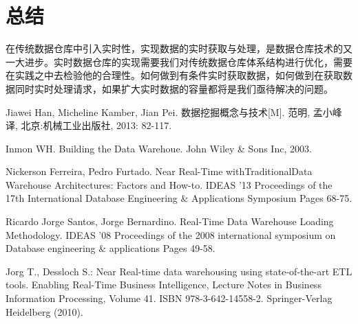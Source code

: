 \documentclass[onecolumn,a4paper,10pt]{article}
\begin{document}
\section{总结}
在传统数据仓库中引入实时性，实现数据的实时获取与处理，是数据仓库技术的又一大进步。实时数据仓库的实现需要我们对传统数据仓库体系结构进行优化，需要在实践之中去检验他的合理性。如何做到有条件实时获取数据，如何做到在获取数据同时实时处理请求，如果扩大实时数据的容量都将是我们亟待解决的问题。

\small
\begin{thebibliography}{99}
\setlength{\itemsep}{0pt}
\setlength{\parskip}{5pt}  %

 Jiawei Han, Micheline Kamber, Jian Pei. 数据挖掘概念与技术[M]. 范明, 孟小峰译, 北京:机械工业出版社, 2013: 82-117.

 Inmon WH. Building the Data Warehoue. John Wiley \& Sons Inc, 2003.

 Nickerson Ferreira, Pedro Furtado. Near Real-Time withTraditionalData Warehouse Architectures: Factors and How-to. IDEAS '13 Proceedings of the 17th International Database Engineering \& Applications Symposium
Pages 68-75.

Ricardo Jorge Santos, Jorge Bernardino. Real-Time Data Warehouse Loading Methodology. IDEAS '08 Proceedings of the 2008 international symposium on Database engineering \& applications Pages 49-58.

 Jorg T., Dessloch S.: Near Real-time data warehousing using state-of-the-art ETL tools. Enabling Real-Time Business Intelligence, Lecture Notes in Business Information Processing, Volume 41. ISBN 978-3-642-14558-2. Springer-Verlag Heidelberg (2010). 
\end{thebibliography}
\end{document}
